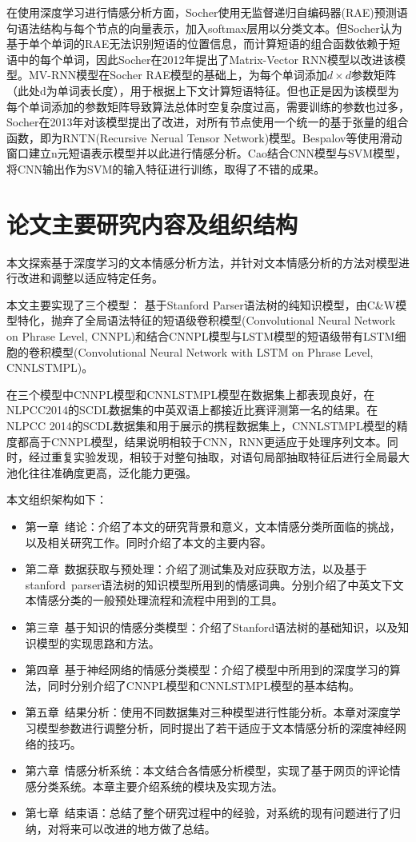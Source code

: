 在使用深度学习进行情感分析方面，Socher\cite{Socher2011}使用无监督递归自编码器(RAE)预测语句语法结构与每个节点的向量表示，加入softmax层用以分类文本。但Socher认为基于单个单词的RAE无法识别短语的位置信息，而计算短语的组合函数依赖于短语中的每个单词，因此Socher在2012年\cite{Socher2012}提出了Matrix-Vector RNN模型以改进该模型。MV-RNN模型在Socher RAE模型的基础上，为每个单词添加$d \times d$参数矩阵（此处d为单词表长度），用于根据上下文计算短语特征。但也正是因为该模型为每个单词添加的参数矩阵导致算法总体时空复杂度过高，需要训练的参数也过多，Socher在2013年对该模型提出了改进\cite{Socher2013}，对所有节点使用一个统一的基于张量的组合函数，即为RNTN(Recursive Nerual Tensor Network)模型。Bespalov等\cite{Bespalov2011}使用滑动窗口建立n元短语表示模型并以此进行情感分析。Cao\cite{CaoXC15}结合CNN模型与SVM模型，将CNN输出作为SVM的输入特征进行训练，取得了不错的成果。
\section{论文主要研究内容及组织结构}
本文探索基于深度学习的文本情感分析方法，并针对文本情感分析的方法对模型进行改进和调整以适应特定任务。


本文主要实现了三个模型： 基于Stanford Parser语法树的纯知识模型，由C\&W模型特化，抛弃了全局语法特征的短语级卷积模型(Convolutional Neural Network on Phrase Level, CNNPL)和结合CNNPL模型与LSTM模型的短语级带有LSTM细胞的卷积模型(Convolutional Neural Network with LSTM on Phrase Level, CNNLSTMPL)。


在三个模型中CNNPL模型和CNNLSTMPL模型在数据集上都表现良好，在NLPCC2014的SCDL数据集的中英双语上都接近比赛评测第一名的结果。在NLPCC 2014的SCDL数据集和用于展示的携程数据集上，CNNLSTMPL模型的精度都高于CNNPL模型，结果说明相较于CNN，RNN更适应于处理序列文本。同时，经过重复实验发现，相较于对整句抽取，对语句局部抽取特征后进行全局最大池化往往准确度更高，泛化能力更强。

本文组织架构如下：
\begin{itemize}
\item 第一章\ 绪论：介绍了本文的研究背景和意义，文本情感分类所面临的挑战，以及相关研究工作。同时介绍了本文的主要内容。
\item 第二章\ 数据获取与预处理：介绍了测试集及对应获取方法，以及基于stanford\ parser语法树的知识模型所用到的情感词典。分别介绍了中英文下文本情感分类的一般预处理流程和流程中用到的工具。
\item 第三章\ 基于知识的情感分类模型：介绍了Stanford语法树的基础知识，以及知识模型的实现思路和方法。
\item 第四章\ 基于神经网络的情感分类模型：介绍了模型中所用到的深度学习的算法，同时分别介绍了CNNPL模型和CNNLSTMPL模型的基本结构。
\item 第五章\ 结果分析：使用不同数据集对三种模型进行性能分析。本章对深度学习模型参数进行调整分析，同时提出了若干适应于文本情感分析的深度神经网络的技巧。
\item 第六章\ 情感分析系统：本文结合各情感分析模型，实现了基于网页的评论情感分类系统。本章主要介绍系统的模块及实现方法。
\item 第七章\ 结束语：总结了整个研究过程中的经验，对系统的现有问题进行了归纳，对将来可以改进的地方做了总结。
\end{itemize}